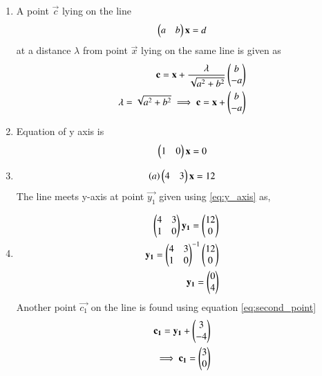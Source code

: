 \renewcommand{\theequation}{\theenumi}
\begin{enumerate}[label=\thesection.\arabic*.,ref=\thesection.\theenumi]

\item A point $\vec{c}$ lying on the line 
\begin{align}
\begin{pmatrix}a&b\end{pmatrix}\mathbf{x} = d
\end{align}
at a distance $\lambda$ from point $\vec{x}$ lying on the same line is given as
\begin{align}
\mathbf{c} = \mathbf{x} + \frac{\lambda}{\sqrt{a^2+b^2}}\begin{pmatrix}b\\-a\end{pmatrix}
\\
\lambda=\sqrt{a^2+b^2}
\implies \mathbf{c} = \mathbf{x} + \begin{pmatrix}b\\-a\end{pmatrix}
\label{eq:second_point}
\end{align}


\item Equation of y axis is 
\begin{align}
\begin{pmatrix}1&0\end{pmatrix}\mathbf{x}=0
\label{eq:y_axis}
\end{align}
\item 
\begin{align}
\left(a\right) \begin{pmatrix}4&3\end{pmatrix}\mathbf{x}=12
\end{align}
The line meets y-axis at point $\vec{y_1}$ given using \ref{eq:y_axis} as,
\item 
\begin{align}
\begin{pmatrix}4&3\\1&0\end{pmatrix}\mathbf{y_1} =\begin{pmatrix}12\\0\end{pmatrix}
\\
\mathbf{y_1}={\begin{pmatrix}4&3\\1&0\end{pmatrix}}^{-1}\begin{pmatrix}12\\0\end{pmatrix}
\\
\mathbf{y_1}=\begin{pmatrix}0\\4\end{pmatrix}
\end{align}
Another point $\vec{c_1}$ on the line is found using equation \ref{eq:second_point}
\begin{align}
\mathbf{c_1} = \mathbf{y_1} + \begin{pmatrix}3\\-4\end{pmatrix}
\\
\implies \mathbf{c_1} = \begin{pmatrix}3\\0\end{pmatrix}
\end{align}
\newline


\end{enumerate}
